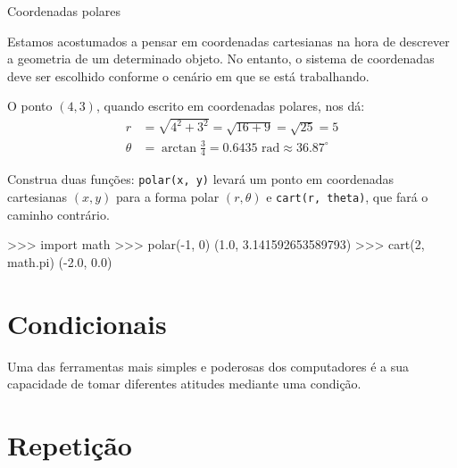     \begin{problem}{Coordenadas polares}
        
        Estamos acostumados a pensar em coordenadas cartesianas na hora de descrever a geometria de um determinado objeto. No entanto, o sistema de coordenadas deve ser escolhido conforme o cenário em que se está trabalhando.
		

        O ponto $(4, 3)$, quando escrito em coordenadas polares, nos dá:
        \begin{align*}
        r &= \sqrt{4^2 + 3^2} = \sqrt{16 + 9} = \sqrt{25} = 5\\
        \theta &= \arctan\frac{3}{4} = 0.6435 \text{ rad} \approx 36.87^{\circ}
        \end{align*}
        
        \proposal
		Construa duas funções: \texttt{polar(x, y)} levará um ponto em coordenadas cartesianas $(x, y)$ para a forma polar $(r, \theta)$ e \texttt{cart(r, theta)}, que fará o caminho contrário.\par
        
        \begin{lstpython}
		>>> import math
		>>> polar(-1, 0)
		(1.0, 3.141592653589793)
		>>> cart(2, math.pi)
		(-2.0, 0.0)
        \end{lstpython}
        
    \end{problem}

	\section*{Condicionais}%
	Uma das ferramentas mais simples e poderosas dos computadores é a sua capacidade de tomar diferentes atitudes mediante uma condição.

	\section*{Repetição}%

